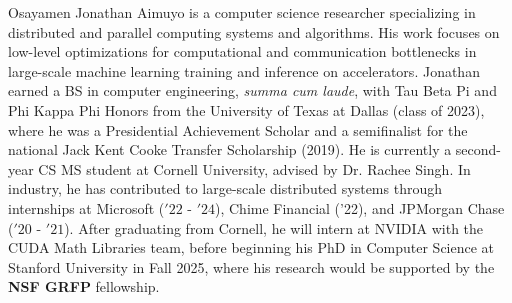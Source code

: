 \begin{biosketch}
Osayamen Jonathan Aimuyo is a computer science researcher specializing in distributed and parallel computing systems
and algorithms.
His work focuses on low-level optimizations for computational and communication bottlenecks in
large-scale machine learning training and inference on accelerators.
Jonathan earned a BS in computer engineering, \textit{summa cum laude}, with Tau Beta Pi and Phi Kappa Phi Honors from the
University of Texas at Dallas (class of 2023),
where he was a Presidential Achievement Scholar and a semifinalist
for the national Jack Kent Cooke Transfer Scholarship (2019).
He is currently a second-year CS MS student at Cornell University,
advised by Dr. Rachee Singh.
In industry, he has contributed to large-scale distributed systems through internships at
Microsoft (\('22\) - \('24\)), Chime Financial ('22), and JPMorgan Chase (\('20\) - \('21\)).
After graduating from Cornell, he will intern at NVIDIA with the CUDA Math Libraries team,
before beginning his PhD in Computer Science at Stanford University in Fall 2025, where his research
would be supported by the \textbf{NSF GRFP} fellowship.
\end{biosketch}